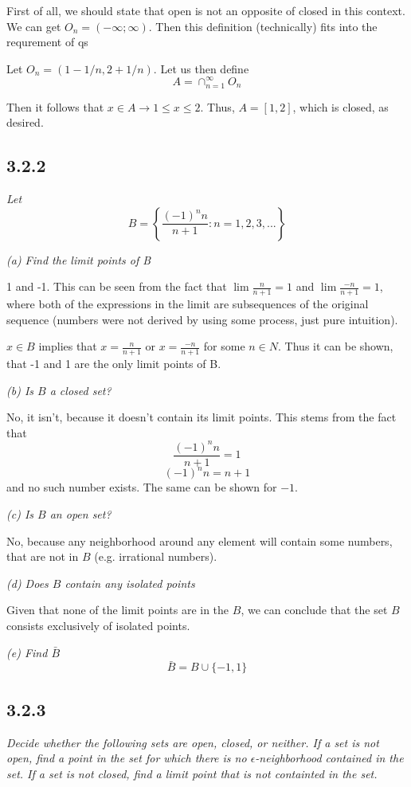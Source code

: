 \documentclass[11pt,oneside,titlepage]{book}
\begin{document}
First of all, we should state that open is not an opposite of closed in this
context. We can get $O_n = (-\infty; \infty)$. Then this definition
(technically) fits into the requrement of qs

Let $O_n = (1 - 1/n, 2 + 1/n)$. Let us then define 
$$A = \cap_{n = 1}^{\infty} O_n$$

Then it follows that $x \in A \to 1 \leq x \leq 2$. Thus, $A = [1,2]$, which is
closed, as desired.


\subsection*{3.2.2 }
\textit{Let }
$$B = \left\{\frac{(-1)^nn}{n + 1}: n = 1,2,3,... \right\}$$

\textit{(a) Find the limit points of B}

1 and -1. This can be seen from the fact that $\lim \frac{n}{n + 1} = 1$ and
$\lim \frac{-n}{n + 1} = 1$, where both of the expressions in the limit
are subsequences of the original sequence (numbers were not derived by using
some process, just pure intuition).

$x \in B$ implies that $x = \frac{n}{n + 1}$  or $x = \frac{-n}{n + 1}$ for
some $n \in N$. Thus it can be shown, that -1 and 1 are the only limit points
of B.

\textit{(b) Is $B$ a closed set?}

No, it isn't, because it doesn't contain its limit points. This stems from
the fact that
$$\frac{(-1)^nn}{n + 1} = 1$$
$$(-1)^nn = n + 1$$
and no such number exists. The same can be shown for $-1$.

\textit{(c) Is $B$ an open set?}

No, because any neighborhood around any element will contain some  numbers,
that are not in $B$ (e.g. irrational numbers).

\textit{(d) Does $B$ contain any isolated points}

Given that none of the limit points are in the $B$, we can conclude that
the set $B$ consists exclusively of isolated points.

\textit{(e) Find $\bar{B}$}
$$\bar{B} = B \cup \{-1, 1\}$$

\subsection*{3.2.3}
\textit{Decide whether the following sets are open, closed, or neither. If a
  set is not open, find a point in the set for which there is no
  $\epsilon$-neighborhood contained in the set. If a set is not closed, find
  a limit point that is not containted in the set.  }
\end{document}
